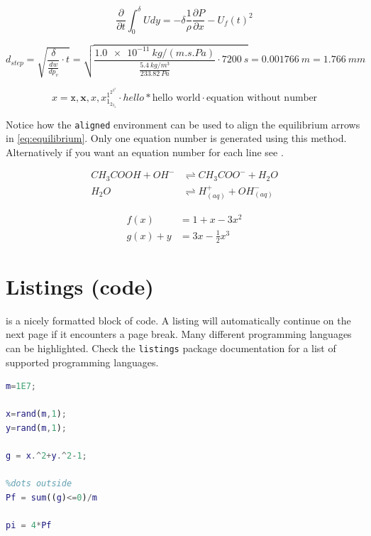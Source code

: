 \documentclass[../main.tex]{subfiles}
\begin{document}
\begin{equation} \label{eq:IME}
    \frac{\partial}{\partial t} \int_{0}^{\delta} U dy = - \delta \frac{1}{\rho}\frac{\partial P}{\partial x}-U_f(t)^2
\end{equation}

\begin{equation} \label{eq:penDepthStep}
d_{step} = \sqrt{\frac{\delta}{\frac{dw}{dp_v}} \cdot t} = 
\sqrt{\frac{\SI{1.0e-11}{kg/(m.s.Pa)}}{\frac{\SI{5.4}{kg/m^3}}{\SI{233.82}{Pa}}} \cdot \SI{7200}{s}} = 
\SI{0.001766}{m} = \SI{1.766}{mm}
\end{equation}

\begin{equation*} %
    x = \mathtt{x}, \mathbf{x}, \mathit{x}, x_{1_{2_{3_{4}}}}^{1^{2^{3^{4}}}} \cdot hello * \text{hello world} \cdot \text{equation without number}
\end{equation*}

Notice how the \texttt{aligned} environment can be used to align the equilibrium arrows in \cref{eq:equilibrium}. Only one equation number is generated using this method. Alternatively if you want an equation number for each line see .

\begin{equation} \label{eq:equilibrium}
\begin{aligned} 
    CH_3COOH + OH^{-} &\rightleftharpoons CH_3COO^{-} + H_2O \\
    H_2O &\rightleftharpoons H^{+}_{(aq)} + OH^{-}_{(aq)}
\end{aligned}
\end{equation}


\begin{align} 
    \label{eq:align1}     
    f(x) &= 1 + x - 3 x^2 \\
    \label{eq:align2} 
    g(x) + y &= 3x - \frac{1}{2} x^3 
\end{align}




\section{Listings (code)}

 is a nicely formatted block of code. A listing will automatically continue on the next page if it encounters a page break. Many different programming languages can be highlighted. Check the \texttt{listings} package documentation for a list of supported programming languages. 

\begin{lstlisting}[language=Matlab, caption = Monte Carlo simulation to estimate the value of $\pi$, label=lst:montecarlo]
%% Monte Carlo simulation, estimation of pi
m=1E7;

x=rand(m,1);
y=rand(m,1);

g = x.^2+y.^2-1;

%dots outside
Pf = sum((g)<=0)/m

pi = 4*Pf
\end{lstlisting}
\end{document}
